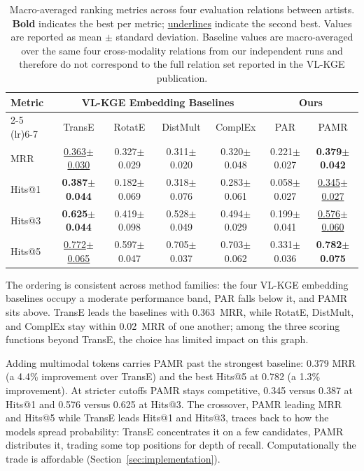 \documentclass[runningheads]{llncs}
\begin{document}
\begin{table}[t]
  \centering
  \setlength{\tabcolsep}{2pt}
  \renewcommand{\arraystretch}{1.15}
  {\footnotesize
    \begin{tabular}{l|cccc|cc}
      \toprule
      \multirow{2}{*}{Metric} &
      \multicolumn{4}{|c|}{VL-KGE Embedding Baselines} &
      \multicolumn{2}{|c|}{Ours} \\
      \cmidrule(lr){2-5} \cmidrule(lr){6-7}
      & TransE & RotatE & DistMult & ComplEx & PAR & PAMR \\
      \midrule
      MRR  & \underline{0.363$\pm$0.030} & 0.327$\pm$0.029 & 0.311$\pm$0.020 & 0.320$\pm$0.048 & 0.221$\pm$0.027 & \textbf{0.379$\pm$0.042} \\
      Hits@1 & \textbf{0.387$\pm$0.044} & 0.182$\pm$0.069 & 0.318$\pm$0.076 & 0.283$\pm$0.061 & 0.058$\pm$0.027 & \underline{0.345$\pm$0.027} \\
      Hits@3 & \textbf{0.625$\pm$0.044} & 0.419$\pm$0.098 & 0.528$\pm$0.049 & 0.494$\pm$0.029 & 0.199$\pm$0.041 & \underline{0.576$\pm$0.060} \\
      Hits@5 & \underline{0.772$\pm$0.065} & 0.597$\pm$0.047 & 0.705$\pm$0.037 & 0.703$\pm$0.062 & 0.331$\pm$0.036 & \textbf{0.782$\pm$0.075} \\
      \bottomrule
  \end{tabular}}
  \caption{Macro-averaged ranking metrics across four evaluation
    relations between artists. \textbf{Bold} indicates the best per metric;
    \underline{underlines} indicate the second best. Values are reported
    as mean $\pm$ standard deviation. Baseline values are macro-averaged
    over the same four cross-modality relations from our independent runs
    and therefore do not correspond to the full relation set reported in
    the VL-KGE publication.}
  \label{tab:results}
\end{table}

The ordering is consistent across method families: the four VL-KGE
embedding baselines occupy a moderate performance band, PAR falls
below it, and PAMR sits above. TransE leads the baselines with
0.363~MRR, while RotatE, DistMult, and ComplEx stay within
0.02~MRR of one another; among the three scoring functions beyond
TransE, the choice has limited impact on this graph.

Adding multimodal tokens carries PAMR past the strongest baseline:
0.379 MRR (a 4.4\% improvement over TransE) and the best Hits@5 at
0.782 (a 1.3\% improvement). At stricter cutoffs PAMR stays
competitive, 0.345 versus 0.387 at Hits@1 and 0.576 versus 0.625 at
Hits@3. The crossover, PAMR leading MRR and Hits@5 while TransE
leads Hits@1 and Hits@3, traces back to how the models spread
probability: TransE concentrates it on a few candidates, PAMR
distributes it, trading some top positions for depth of recall.
Computationally the trade is affordable (Section~\ref{sec:implementation}).
\end{document}
